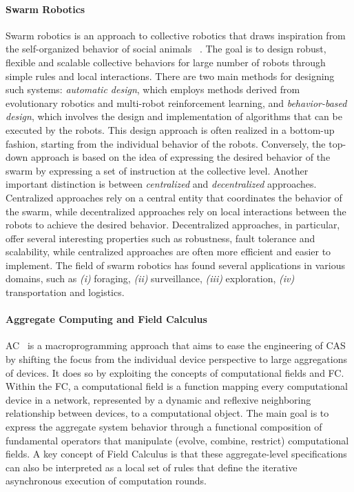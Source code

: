 \documentclass[12pt]{article}
\begin{document}
\paragraph{\textbf{Swarm Robotics}} Swarm robotics is an approach to collective robotics that draws inspiration from the self-organized behavior of social animals ~\cite{brambilla2013swarm}. The goal is to design robust, flexible and scalable 
collective behaviors for large number of robots through simple rules and local interactions. There are two main methods for designing such systems: \textit{automatic design}, which employs methods derived from
evolutionary robotics and multi-robot reinforcement learning, and \textit{behavior-based design}, which involves the design and implementation of algorithms that can be executed by the robots. This design approach is often realized
in a bottom-up fashion, starting from the individual behavior of the robots. Conversely, the top-down approach is based on the idea of expressing the desired behavior of the swarm by expressing a set of instruction at the collective level.
Another important distinction is between \textit{centralized} and \textit{decentralized} approaches. Centralized approaches rely on a central entity that coordinates the behavior of the swarm, while decentralized approaches rely on local interactions between the robots to achieve the desired behavior.
Decentralized approaches, in particular, offer several interesting properties such as robustness, fault tolerance and scalability, while centralized approaches are often more efficient and easier to implement.
The field of swarm robotics has found several applications in various domains, such as \textit{(i)} foraging, \textit{(ii)} surveillance, \textit{(iii)} exploration, \textit{(iv)} transportation and logistics.


\paragraph{\textbf{Aggregate Computing and Field Calculus}} AC~\cite{beal2016aggregate} is a macroprogramming approach that aims to ease the engineering of CAS by shifting the
focus from the individual device perspective to large aggregations of devices. It does so by exploiting the concepts of computational fields and FC.
Within the FC, a computational field is a function mapping every computational device in a network, represented by a dynamic and reflexive neighboring
relationship between devices, to a computational object. The main goal is to express the aggregate system behavior
through a functional composition of fundamental operators that manipulate (evolve, combine, restrict)
computational fields. A key concept of Field Calculus is that these aggregate-level specifications can
also be interpreted as a local set of rules that define the iterative asynchronous execution of computation rounds.
\end{document}
